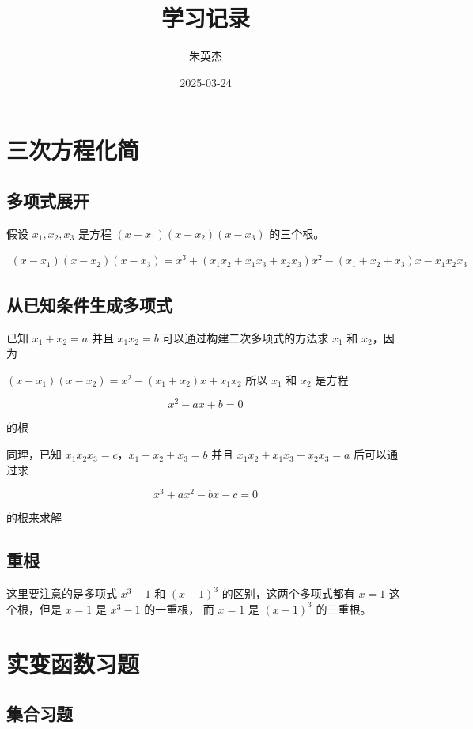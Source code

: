 \documentclass[12pt,a4paper]{ctexart}
\title{学习记录}
\author{朱英杰}
\date{2025-03-24}
\begin{document}
\maketitle

\section{三次方程化简}

\subsection{多项式展开}

假设 $x_1, x_2, x_3$ 是方程 $(x-x_1)(x-x_2)(x-x_3)$ 的三个根。

\begin{align*}
   (x-x_1)(x-x_2)(x-x_3) = x^3 +(x_1x_2 + x_1x_3 + x_2x_3)x^2 - (x_1 + x_2 + x_3)x - x_1x_2x_3
\end{align*}

\subsection{从已知条件生成多项式}

已知 $x_1 + x_2 = a$ 并且 $x_1 x_2 = b$ 可以通过构建二次多项式的方法求 $x_1$ 和 $x_2$，因为

$(x-x_1)(x-x_2) = x^2 - (x_1 + x_2)x + x_1 x_2$ 所以 $x_1$ 和 $x_2$ 是方程

\[
x^2 - ax + b = 0
\]

的根

同理，已知 $x_1x_2x_3 = c$，$x_1 + x_2 + x_3 = b$ 并且 $x_1x_2 + x_1x_3 + x_2x_3 = a$ 后可以通过求

\[
x^3 + ax^2 - bx -c = 0
\]

的根来求解

\subsection{重根}

这里要注意的是多项式 $x^3 - 1$ 和 $(x-1)^3$ 的区别，这两个多项式都有 $x=1$ 这个根，但是 $x=1$ 是 $x^3-1$ 的一重根，
而 $x=1$ 是 $(x-1)^3$ 的三重根。

\section{实变函数习题}

\subsection{集合习题}
\end{document}
